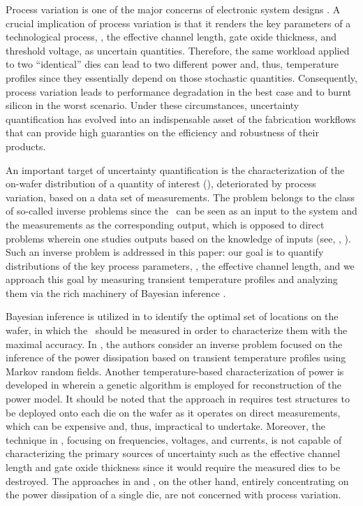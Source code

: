 Process variation is one of the major concerns of electronic system designs \cite{chandrakasan2001, srivastava2010}. A crucial implication of process variation is that it renders the key parameters of a technological process, \eg, the effective channel length, gate oxide thickness, and threshold voltage, as uncertain quantities.
Therefore, the same workload applied to two ``identical'' dies can lead to two different power and, thus, temperature profiles since they essentially depend on those stochastic quantities.
Consequently, process variation leads to performance degradation in the best case and to burnt silicon in the worst scenario.
Under these circumstances, uncertainty quantification has evolved into an indispensable asset of the fabrication workflows that can provide high guaranties on the efficiency and robustness of their products.

An important target of uncertainty quantification is the characterization of the on-wafer distribution of a quantity of interest (\qoi), deteriorated by process variation, based on a data set of measurements.
The problem belongs to the class of so-called inverse problems since the \qoi\ can be seen as an input to the system and the measurements as the corresponding output, which is opposed to direct problems wherein one studies outputs based on the knowledge of inputs (see, \eg, \cite{juan2011, juan2012}).
Such an inverse problem is addressed in this paper: our goal is to quantify distributions of the key process parameters, \eg, the effective channel length, and we approach this goal by measuring transient temperature profiles and analyzing them via the rich machinery of Bayesian inference \cite{gelman2004}.

Bayesian inference is utilized in \cite{zhang2010} to identify the optimal set of locations on the wafer, in which the \qois\ should be measured in order to characterize them with the maximal accuracy.
In \cite{paek2012}, the authors consider an inverse problem focused on the inference of the power dissipation based on transient temperature profiles using Markov random fields.
Another temperature-based characterization of power is developed in \cite{mesa-martinez2007} wherein a genetic algorithm is employed for reconstruction of the power model.
It should be noted that the approach in \cite{zhang2010} requires test structures to be deployed onto each die on the wafer as it operates on direct measurements, which can be expensive and, thus, impractical to undertake. Moreover, the technique in \cite{zhang2010}, focusing on frequencies, voltages, and currents, is not capable of characterizing the primary sources of uncertainty such as the effective channel length and gate oxide thickness since it would require the measured dies to be destroyed. The approaches in \cite{paek2012} and \cite{mesa-martinez2007}, on the other hand, entirely concentrating on the power dissipation of a single die, are not concerned with process variation.

